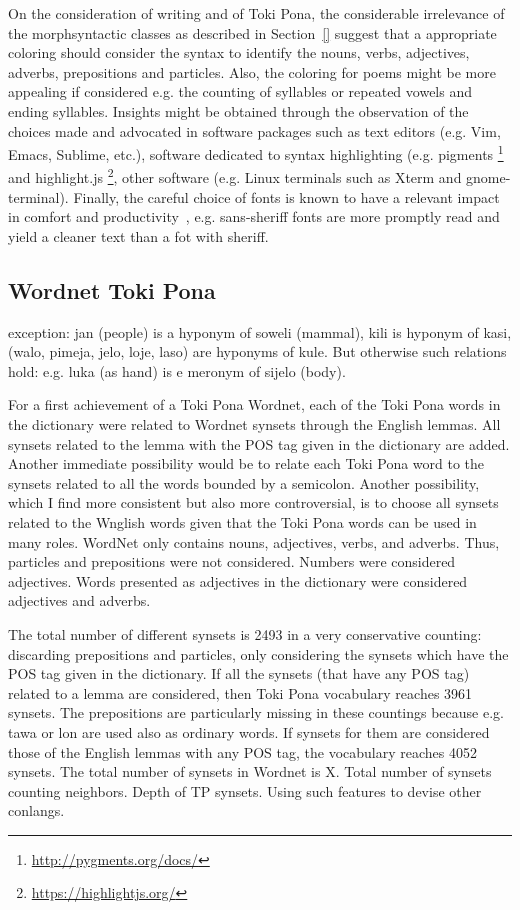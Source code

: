 \documentclass{article}
\begin{document}
On the consideration of writing and of Toki Pona,
the considerable irrelevance of the morphsyntactic classes as
described in Section~\ref{} suggest that a appropriate coloring should
consider the syntax to identify the nouns, verbs, adjectives, adverbs,
prepositions and particles.
Also, the coloring for poems might be more appealing if considered
e.g. the counting of syllables or repeated vowels and ending
syllables.
Insights might be obtained through the observation of the
choices made and advocated in software packages such as text editors
(e.g. Vim, Emacs, Sublime, etc.),
software dedicated to syntax highlighting (e.g.
pigments \footnote{\url{http://pygments.org/docs/}} and 
highlight.js \footnote{\url{https://highlightjs.org/}},
other software (e.g. Linux terminals such as Xterm and gnome-terminal).
Finally, the careful choice of fonts is known to have
a relevant impact in comfort and productivity~\cite{fonts},
e.g. sans-sheriff fonts are more promptly read and yield a cleaner
text than a fot with sheriff.

\subsection{Wordnet Toki Pona}\label{wn}
exception: jan (people)
is a hyponym of soweli (mammal),
kili is hyponym of kasi,
(walo, pimeja, jelo, loje, laso) are hyponyms of kule.
But otherwise such relations hold:
e.g. luka (as hand) is e meronym of sijelo (body).

For a first achievement of a Toki Pona Wordnet,
each of the Toki Pona words in the dictionary
were related to Wordnet synsets
through the English lemmas.
All synsets related to the lemma with the POS tag
given in the dictionary are added.
Another immediate possibility would be to
relate each Toki Pona word to the synsets
related to all the words bounded by a semicolon.
Another possibility, which I find more consistent
but also more controversial,
is to choose all synsets related to the Wnglish
words given that the Toki Pona words can be used
in many roles.
WordNet only contains nouns, adjectives, verbs, and adverbs.
Thus, particles and prepositions were not considered.
Numbers were considered adjectives.
Words presented as adjectives in the dictionary
were considered adjectives and adverbs.

The total number of different synsets is 2493 in a very conservative
counting: discarding prepositions and particles,
only considering the synsets which have the POS tag
given in the dictionary.
If all the synsets (that have any POS tag)
related to a lemma are considered, 
then Toki Pona vocabulary reaches 3961 synsets.
The prepositions are particularly missing in these
countings because e.g. tawa or lon are used also
as ordinary words.
If synsets for them are considered those of the English
lemmas with any POS tag, the vocabulary reaches 4052
synsets.
The total number of synsets in Wordnet is X.
Total number of synsets counting neighbors.
Depth of TP synsets.
Using such features to devise other conlangs.
\end{document}
